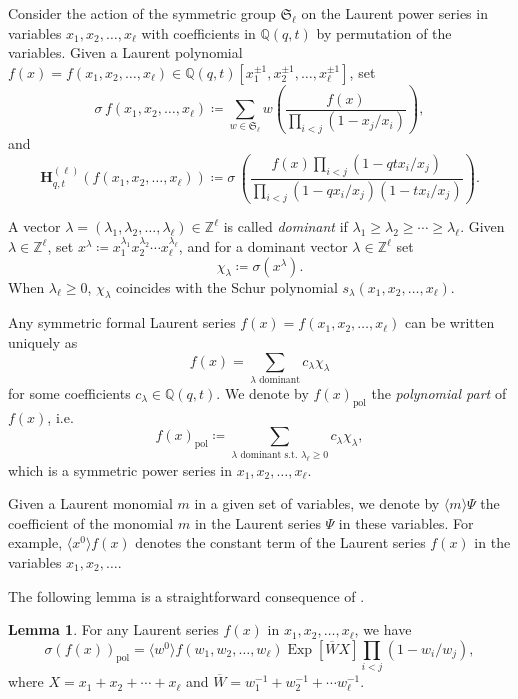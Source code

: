 \documentclass[reqno]{amsart}
\theoremstyle{plain}
\theoremstyle{definition}
\newtheorem{lemma}[theorem]{Lemma}
\theoremstyle{remark}
\DeclareMathOperator{\Exp}{Exp}
\newcommand{\<}{\langle}
\renewcommand{\>}{\rangle}
\begin{document}
Consider the action of the symmetric group $\mathfrak{S}_\ell$ on the Laurent power series in variables $x_1,x_2,\dots,x_\ell$ with coefficients in $\mathbb{Q}(q,t)$ by permutation of the variables. Given a Laurent polynomial $f(x) = f(x_1,x_2,\dots,x_\ell) \in \mathbb{Q}(q,t)[x_1^{\pm 1}, x_2^{\pm 1}, \dots, x_\ell^{\pm 1}]$, set
\[
    \textbf{$\sigma$}\, f(x_1,x_2,\dots,x_\ell) \coloneqq \sum_{w\in \mathfrak{S}_\ell}w\left(\frac{f(x)}{\prod_{i<j}(1-x_j/x_i)}\right),
\]
and
\[
    \mathbf{H}_{q,t}^{(\ell)}(f(x_1,x_2,\dots,x_\ell)) \coloneqq \textbf{$\sigma$}\, \left( \frac{f(x) \prod_{i<j}(1-qtx_i/x_j) }{\prod_{i<j}(1-qx_i/x_j)(1-tx_i/x_j)}\right).
\]

A vector $\lambda=(\lambda_1,\lambda_2,\dots,\lambda_\ell) \in \mathbb{Z}^\ell$ is called \emph{dominant} if $\lambda_1\geq \lambda_2\geq\cdots \geq \lambda_\ell$. Given $\lambda\in \mathbb{Z}^\ell$, set $x^\lambda \coloneqq x_1^{\lambda_1}x_2^{\lambda_2}\cdots x_\ell^{\lambda_\ell}$, and for a dominant vector $\lambda\in \mathbb{Z}^\ell$ set
\[\chi_\lambda \coloneqq \textbf{$\sigma$}(x^\lambda).\]
When $\lambda_\ell\geq 0$, $\chi_\lambda$ coincides with the Schur polynomial $s_\lambda(x_1,x_2,\dots,x_\ell)$.

Any symmetric formal Laurent series $f(x) = f(x_1,x_2,\dots,x_\ell)$ can be written uniquely as 
\[ f(x) = \sum_{\lambda\text{ dominant}} c_\lambda \chi_\lambda \] 
for some coefficients $c_\lambda\in \mathbb{Q}(q,t)$. We denote by $f(x)_{\text{pol}}$ the \emph{polynomial part} of $f(x)$, i.e.\ 
\[ f(x)_{\text{pol}} \coloneqq \sum_{\lambda\text{ dominant s.t.\ }\lambda_\ell\geq 0} c_\lambda \chi_\lambda, \]
which is a symmetric power series in $x_1,x_2,\dots,x_\ell$.

Given a Laurent monomial $m$ in a given set of variables, we denote by $\langle m\rangle \Psi$ the coefficient of the monomial $m$ in the Laurent series $\Psi$ in these variables. For example, $\langle x^0\rangle f(x)$ denotes the constant term of the Laurent series $f(x)$ in the variables $x_1,x_2,\dots$.

The following lemma is a straightforward consequence of \cite[Lemma~2.3.1, Equation~(21)]{BHMPS2023ShuffleAnyLine}.
\begin{lemma}
    \label{lem:poly_part}
    For any Laurent series $f(x)$ in $x_1,x_2,\dots,x_\ell$, we have
    \[\textbf{$\sigma$} (f(x))_{\text{pol}}=\langle w^0 \rangle f(w_1,w_2,\dots,w_\ell) \Exp[\overline{W}X]\prod_{i<j}(1-w_i/w_j),\]
    where $X=x_1+x_2+\cdots +x_\ell$ and $\overline{W}=w_1^{-1}+w_2^{-1}+\cdots w_\ell^{-1}$.
\end{lemma}
\end{document}
